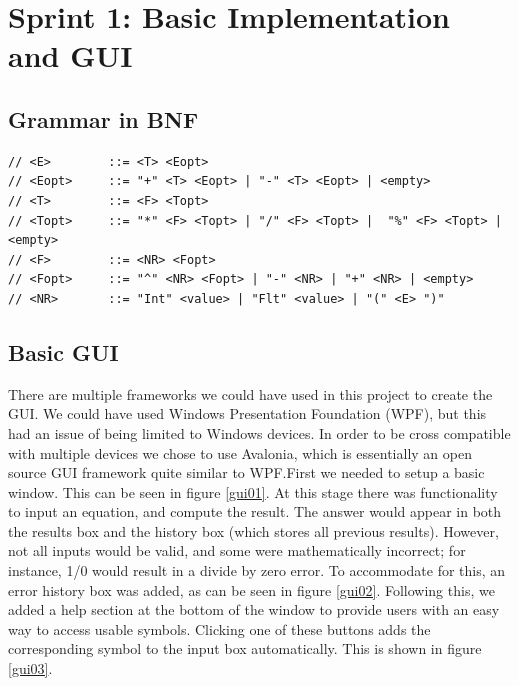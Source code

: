 \documentclass[a4paper, oneside, 11pt]{report}
\begin{document}
    \section{Sprint 1: Basic Implementation and GUI}
    \subsection{Grammar in BNF}
    \begin{verbatim}
// <E>        ::= <T> <Eopt>
// <Eopt>     ::= "+" <T> <Eopt> | "-" <T> <Eopt> | <empty>
// <T>        ::= <F> <Topt>
// <Topt>     ::= "*" <F> <Topt> | "/" <F> <Topt> |  "%" <F> <Topt> |<empty>
// <F>        ::= <NR> <Fopt>
// <Fopt>     ::= "^" <NR> <Fopt> | "-" <NR> | "+" <NR> | <empty>
// <NR>       ::= "Int" <value> | "Flt" <value> | "(" <E> ")"
    \end{verbatim}

    \subsection{Basic GUI}
    There are multiple frameworks we could have used in this project to create the GUI. We could have used Windows Presentation Foundation (WPF), but this had an issue of being limited to Windows devices. In order to be cross compatible with multiple devices we chose to use Avalonia, which is essentially an open source GUI framework quite similar to WPF.\newline First we needed to setup a basic window. This can be seen in figure \ref{gui01}. At this stage there was functionality to input an equation, and compute the result. The answer would appear in both the results box and the history box (which stores all previous results). However, not all inputs would be valid, and some were mathematically incorrect; for instance, 1/0 would result in a divide by zero error. To accommodate for this, an error history box was added, as can be seen in figure \ref{gui02}. Following this, we added a help section at the bottom of the window to provide users with an easy way to access usable symbols. Clicking one of these buttons adds the corresponding symbol to the input box automatically. This is shown in figure \ref{gui03}.
\end{document}
